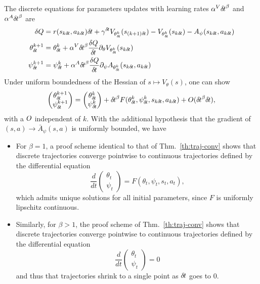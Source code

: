 The discrete equations for parameters updates with learning rates $\alpha^V {\delta\hspace{-.1em}t}^\beta$ and
$\alpha^A {\delta\hspace{-.1em}t}^\beta$ are
\begin{align}
	\delta Q &= r(s_{k \deltat}, a_{k \deltat}) \deltat + 
		\gamma^\deltat V_{\theta^{k}_\deltat}(s_{(k + 1)\deltat}) - 
		V_{\theta^k_\deltat}(s_{k\deltat}) - A_\psi(s_{k \deltat}, a_{k \deltat})\\
	\theta^{k+1}_\deltat &= \theta^k_\deltat + 
	\alpha^V \deltat^\beta \frac{\delta Q
	}{\deltat}\partial_\theta V_{\theta^k_\deltat}(s_{k\deltat})\\
	\psi^{k+1}_\deltat &= \psi^k_\deltat + 
	\alpha^A \deltat^\beta \frac{\delta Q
	}{\deltat}
	\partial_\psi A_{\theta^k_\deltat}(s_{k\deltat}, a_{k\deltat})
\end{align}
Under uniform boundedness of the Hessian of $s \mapsto V_\theta(s)$,
one can show
\begin{equation}
	\begin{pmatrix}
		\theta_{\delta\hspace{-.1em}t}^{k+1} \\
		\psi_{\delta\hspace{-.1em}t}^{k+1}
	\end{pmatrix} =
	\begin{pmatrix}
		\theta_{\delta\hspace{-.1em}t}^{k} \\
		\psi_{\delta\hspace{-.1em}t}^{k}
	\end{pmatrix} + {\delta\hspace{-.1em}t}^\beta F(\theta_{\delta\hspace{-.1em}t}^k, \psi_{\delta\hspace{-.1em}t}^k, s_{k {\delta\hspace{-.1em}t}}, a_{k{\delta\hspace{-.1em}t}}) + O({\delta\hspace{-.1em}t}^\beta {\delta\hspace{-.1em}t}),
\end{equation}
with a $O$ independent of $k$. With the additional hypothesis that the gradient of
$(s, a) \rightarrow \bar{A}_\psi(s, a)$ is uniformly bounded, we have
\begin{itemize}
	\item For $\beta = 1$, a proof scheme identical to that of Thm.~\ref{th:traj-conv} shows that
discrete trajectories converge pointwise to continuous trajectories defined by the differential equation
\begin{equation}
	\frac{d}{dt}\begin{pmatrix}
		\theta_t \\
		\psi_t
	\end{pmatrix} =
	F(\theta_t, \psi_t, s_t, a_t),
\end{equation}
which admits unique solutions for all initial parameters, since $F$ is uniformly lipschitz continuous.
\item Similarly, for $\beta > 1$, the proof scheme of Thm.~\ref{th:traj-conv} shows that
discrete trajectories converge pointwise to continuous trajectories defined by the differential equation
\begin{equation}
	\frac{d}{dt}\begin{pmatrix}
		\theta_t \\
		\psi_t
	\end{pmatrix} = 0
\end{equation}
and thus that trajectories shrink to a single point as ${\delta\hspace{-.1em}t}$ goes to $0$.
\end{itemize}
